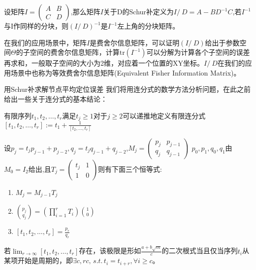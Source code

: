 \begin{definition}
    设矩阵$I=\left(\begin{array}{cc}A&B\\C&D\end{array}\right)$,那么矩阵$I$关于D的Schur补定义为$
    I/\ D=A-BD^{-1}C$,若$I^{-1}$与I作同样的分块，则$(I/\ D)^{-1}$是$I^{-1}$左上角的分块矩阵。
\end{definition}
\begin{remark}
	在我们的应用场景中，矩阵$I$是费舍尔信息矩阵，可以证明$(I/\ D)$给出于参数空间$\Theta$的子空间的费舍尔信息矩阵，计算$\text{tr}(I^{-1})$可以分解为计算各个子空间的误差再求和，一般取子空间的大小为2维，对应着一个位置的XY坐标。$I/\ D$在我们的应用场景中也称为等效费舍尔信息矩阵(Equivalent Fisher Information Matrix)。
\end{remark}
{用Schur补求解节点平均定位误差}
我们将用连分式的数学方法分析问题，在此之前给出一些关于连分式的基本结论\cite{ContinuedFraction}：
\begin{definition}
  有限序列$t_1,t_2,\dots,t_r$满足$t_j\geq 1$对于$j\geq2$可以递推地定义有限连分式$[t_1,t_2,\dots,t_r]:=t_1+\frac{1}{[t_2,\dots,t_r]}$
\end{definition}
\begin{theorem}\label{thm:basic}
  设$p_j=t_j p_{j-1}+p_{j-2},q_j=t_j q_{j-1}+q_{j-2}$,$M_j=\left(\begin{matrix}p_j&p_{j-1}\\q_j&q_{j-1}\end{matrix}\right)$
  $p_0,p_1,q_0,q_1$由$M_0=I_2$给出,且$T_j=\left(\begin{matrix}t_j&1\\1&0\end{matrix}\right)$则有下面三个恒等式:
  \begin{enumerate}
    \item $M_j=M_{j-1}T_j$
    \item $\binom{p_j}{q_j}=(\prod_{i=1}^r T_i )\binom{1}{0}$
    \item $[t_1,t_2,\dots,t_r]=\frac{p_r}{q_r}$
  \end{enumerate}
\end{theorem}
\begin{theorem}\label{theorem:quadratic_cyclic}
若$\lim_{r\to \infty}[t_1,t_2,\dots,t_r]$存在，该极限是形如$\frac{a+b\sqrt{m}}{c}$的二次根式当且仅当序列$t_i$从某项开始是周期的，即$\exists c,rc,\,s.t.\, t_{i}=t_{i+r},\forall i\geq c$。
\end{theorem}
